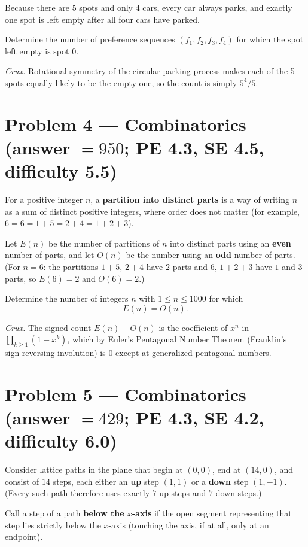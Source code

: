 \documentclass[11pt]{article}
\begin{document}
Because there are $5$ spots and only $4$ cars, every car always parks, and exactly one spot is left empty after all four cars have parked.

Determine the number of preference sequences $(f_1,f_2,f_3,f_4)$ for which the spot left empty is spot $0$.

\medskip

\textit{Crux.} Rotational symmetry of the circular parking process makes each of the 5 spots equally likely to be the empty one, so the count is simply $5^4/5$.

\section*{Problem 4 --- Combinatorics \quad (answer $=950$; PE 4.3, SE 4.5, difficulty 5.5)}

For a positive integer $n$, a \textbf{partition into distinct parts} is a way of writing $n$ as a sum of distinct positive integers, where order does not matter (for example, $6 = 6 = 1+5 = 2+4 = 1+2+3$).

Let $E(n)$ be the number of partitions of $n$ into distinct parts using an \textbf{even} number of parts, and let $O(n)$ be the number using an \textbf{odd} number of parts. (For $n=6$: the partitions $1+5,\,2+4$ have $2$ parts and $6,\,1+2+3$ have $1$ and $3$ parts, so $E(6)=2$ and $O(6)=2$.)

Determine the number of integers $n$ with $1 \le n \le 1000$ for which
$$E(n) = O(n).$$

\medskip

\textit{Crux.} The signed count $E(n)-O(n)$ is the coefficient of $x^n$ in $\prod_{k\ge1}(1-x^k)$, which by Euler's Pentagonal Number Theorem (Franklin's sign-reversing involution) is $0$ except at generalized pentagonal numbers.

\section*{Problem 5 --- Combinatorics \quad (answer $=429$; PE 4.3, SE 4.2, difficulty 6.0)}

Consider lattice paths in the plane that begin at $(0,0)$, end at $(14,0)$, and consist of $14$ steps, each either an \textbf{up} step $(1,1)$ or a \textbf{down} step $(1,-1)$. (Every such path therefore uses exactly $7$ up steps and $7$ down steps.)

Call a step of a path \textbf{below the $x$-axis} if the open segment representing that step lies strictly below the $x$-axis (touching the axis, if at all, only at an endpoint).
\end{document}
